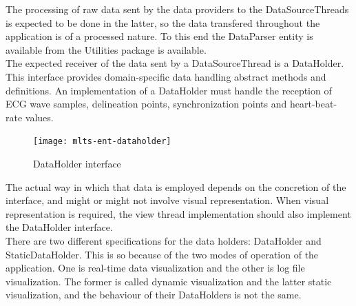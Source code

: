 		The processing of raw data sent by the data providers to the DataSourceThreads is expected to be done in the latter, so the data transfered throughout the application is of a processed nature. To this end the DataParser entity is available from the Utilities package is available.\\

		The expected receiver of the data sent by a DataSourceThread is a DataHolder. This interface provides domain-specific data handling abstract methods and definitions. An implementation of a DataHolder must handle the reception of ECG wave samples, delineation points, synchronization points and heart-beat-rate values.\\

		\begin{figure}[h]
		\begin{center}
	    	\texttt{[image: mlts-ent-dataholder]}
  		\end{center}
  		\caption{DataHolder interface}
		\end{figure}

		The actual way in which that data is employed depends on the concretion of the interface, and might or might not involve visual representation. When visual representation is required, the view thread implementation should also implement the DataHolder interface.\\


		There are two different specifications for the data holders: DataHolder and StaticDataHolder. This is so because of the two modes of operation of the application. One is real-time data visualization and the other is log file visualization. The former is called dynamic visualization and the latter static visualization, and the behaviour of their DataHolders is not the same.\\

